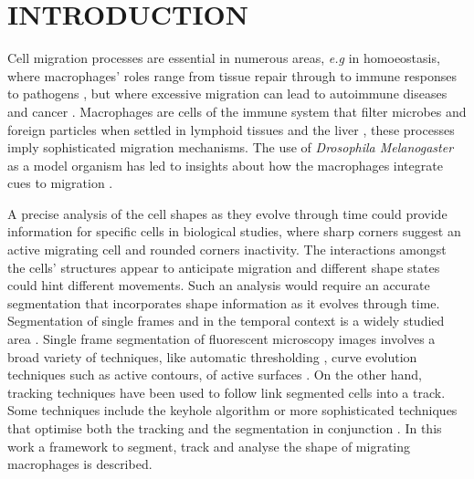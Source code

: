 \vspace{-0.6em}
\section{INTRODUCTION}\label{sec:intro}
Cell migration processes are essential in numerous areas,
\emph{e.g} in homoeostasis, where macrophages' 
roles range from tissue repair through to immune responses
to pathogens \cite{wynn2013}, but
where excessive migration can lead to autoimmune diseases and cancer \cite{pocha2014}.
Macrophages are cells of the immune system that filter
microbes and foreign particles when settled in lymphoid tissues and the liver
\cite{Martinez2008},  these processes imply sophisticated migration mechanisms.
The use of  \emph{Drosophila Melanogaster} as a  model organism has led to
insights about how the
macrophages integrate cues to migration \cite{wood2017}.

A precise analysis of the cell shapes as they evolve through time could provide
information for specific cells in biological studies,
where sharp corners suggest an active migrating cell and 
rounded corners inactivity.
The interactions amongst the cells' structures appear to anticipate migration
\cite{Stramer2010} and different shape states could hint different movements.
Such an analysis would require an accurate segmentation
that incorporates shape information as it evolves through time.
Segmentation of single frames and in the temporal context is a widely studied
area \cite{mavska2014}. Single frame segmentation of fluorescent microscopy
images involves a broad variety of techniques, like automatic
thresholding \cite{Hannah1995a}, curve evolution techniques such as active
contours, of active surfaces \cite{dufour2005}. On the other hand, tracking
techniques have been used to follow link segmented cells into a track.
Some techniques include the keyhole algorithm \cite{Henry2013} or more
sophisticated techniques that optimise both the tracking
and the segmentation in conjunction \cite{Collins2014}.
In this work a framework to segment, track and analyse the shape of
migrating macrophages is described.
\vspace{-0.5em}